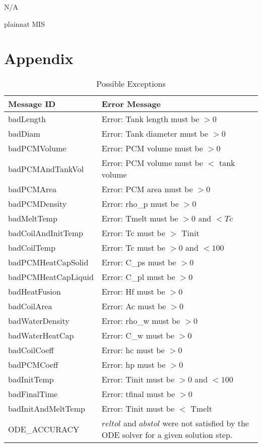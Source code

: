 \documentclass[12pt, titlepage]{article}
\begin{document}
N/A

\newpage

 {plainnat}
 {MIS}

\section{Appendix} \label{Appendix}

\renewcommand{\arraystretch}{1.2}

\begin{longtable}{l p{12cm}}
\caption{Possible Exceptions} \\
\toprule
\textbf{Message ID} & \textbf{Error Message} \\
\midrule
badLength & Error: Tank length must be $> 0$ \\
badDiam & Error: Tank diameter must be $> 0$ \\
badPCMVolume & Error: PCM volume must be $> 0$ \\
badPCMAndTankVol & Error: PCM volume must be $<$ tank volume \\
badPCMArea & Error: PCM area must be $> 0$ \\
badPCMDensity & Error: rho\_p must be $> 0$ \\
badMeltTemp & Error: Tmelt must be $> 0$ and $< Tc$ \\
badCoilAndInitTemp & Error: Tc must be $>$ Tinit \\
badCoilTemp & Error: Tc must be $> 0$ and $< 100$ \\
badPCMHeatCapSolid & Error: C\_ps must be $> 0$ \\
badPCMHeatCapLiquid & Error: C\_pl must be $> 0$ \\
badHeatFusion & Error: Hf must be $> 0$ \\
badCoilArea & Error: Ac must be $> 0$ \\
badWaterDensity & Error: rho\_w must be $> 0$ \\
badWaterHeatCap & Error: C\_w must be $> 0$ \\
badCoilCoeff & Error: hc must be $> 0$ \\
badPCMCoeff & Error: hp must be $> 0$ \\
badInitTemp & Error: Tinit must be $> 0$ and $< 100$ \\
badFinalTime & Error: tfinal must be $> 0$ \\
badInitAndMeltTemp & Error: Tinit must be $<$ Tmelt \\
ODE\_ACCURACY & $reltol$ and $abstol$ were not satisfied by the ODE solver for a given solution step. \\

\end{longtable}
\end{document}
